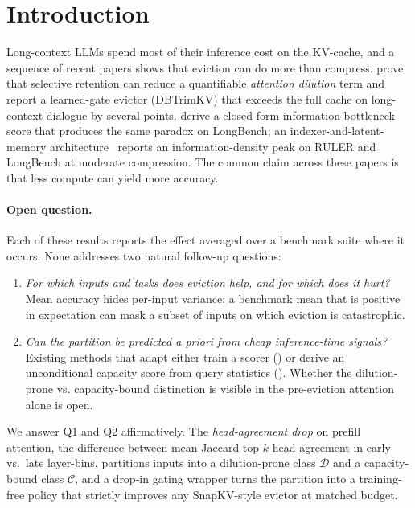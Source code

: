 \documentclass{article}
\begin{document}
\section{Introduction}
\label{sec:intro}

Long-context LLMs spend most of their inference cost on the KV-cache, and a
sequence of recent papers shows that eviction can do more than compress.
\citet{arxiv260509649} prove that selective retention can reduce a quantifiable
\emph{attention dilution} term and report a learned-gate evictor (DBTrimKV) that
exceeds the full cache on long-context dialogue by several points.
\citet{arxiv260425975} derive a closed-form
information-bottleneck score that produces the same paradox on LongBench; an
indexer-and-latent-memory architecture~\citep{arxiv260525475}
reports an information-density peak on RULER and LongBench at moderate compression.
The common claim across these papers is that less compute can yield more accuracy.

\paragraph{Open question.} Each of these results reports the effect averaged over
a benchmark suite where it occurs. None addresses two natural follow-up questions:
\begin{enumerate}
  \item[(Q1)] \emph{For which inputs and tasks does eviction help, and for which
  does it hurt?} Mean accuracy hides per-input variance: a benchmark mean that is
  positive in expectation can mask a subset of inputs on which eviction is
  catastrophic.
  \item[(Q2)] \emph{Can the partition be predicted a priori from cheap inference-time
  signals?} Existing methods that adapt either train a scorer (\citealp{arxiv260509649,arxiv260525475,arxiv260203203,arxiv260210238})
  or derive an unconditional capacity score from query statistics
  (\citealp{arxiv260425975}). Whether the dilution-prone vs.
  capacity-bound distinction is visible in the pre-eviction attention alone is open.
\end{enumerate}

We answer Q1 and Q2 affirmatively. The \emph{head-agreement drop} on
prefill attention, the difference between mean Jaccard top-$k$ head
agreement in early vs.\ late layer-bins, partitions inputs into a
dilution-prone class $\mathcal{D}$ and a capacity-bound class
$\mathcal{C}$, and a drop-in gating wrapper turns the partition into a
training-free policy that strictly improves any SnapKV-style evictor at
matched budget.
\end{document}

